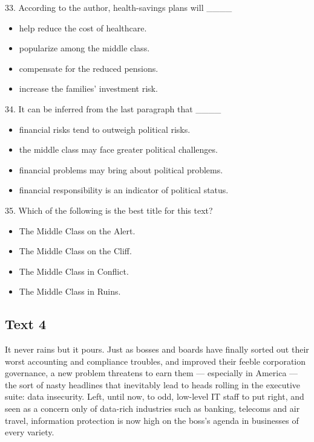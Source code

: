 \documentclass[UTF8,11pt]{ctexart}
\begin{document}
33. According to the author, health-savings plans will \_\_\_\_


\begin{itemize}[leftmargin=2em,itemsep=.2em,topsep=.4em]\item[A.] help reduce the cost of healthcare.
\item[B.] popularize among the middle class.
\item[C.] compensate for the reduced pensions.
\item[D.] increase the families’ investment risk.
\end{itemize}

34. It can be inferred from the last paragraph that \_\_\_\_


\begin{itemize}[leftmargin=2em,itemsep=.2em,topsep=.4em]\item[A.] financial risks tend to outweigh political risks.
\item[B.] the middle class may face greater political challenges.
\item[C.] financial problems may bring about political problems.
\item[D.] financial responsibility is an indicator of political status.
\end{itemize}

35. Which of the following is the best title for this text?


\begin{itemize}[leftmargin=2em,itemsep=.2em,topsep=.4em]\item[A.] The Middle Class on the Alert.
\item[B.] The Middle Class on the Cliff.
\item[C.] The Middle Class in Conflict.
\item[D.] The Middle Class in Ruins.
\end{itemize}

\subsection*{\textbf{Text 4}}


It never rains but it pours. Just as bosses and boards have finally sorted out their worst accounting and compliance troubles, and improved their feeble corporation governance, a new problem threatens to earn them — especially in America — the sort of nasty headlines that inevitably lead to heads rolling in the executive suite: data insecurity. Left, until now, to odd, low-level IT staff to put right, and seen as a concern only of data-rich industries such as banking, telecoms and air travel, information protection is now high on the boss’s agenda in businesses of every variety.
\end{document}
